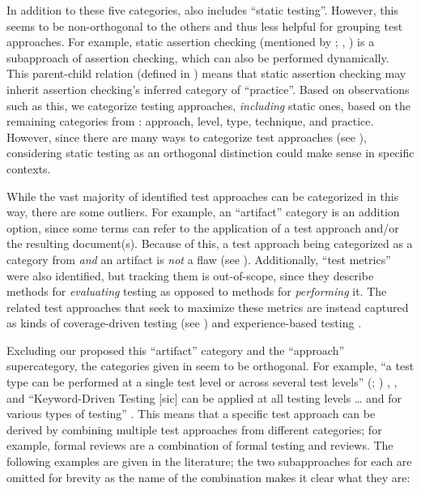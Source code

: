In addition to these five categories, \citet[Fig.~2]{IEEE2022} also includes
``static testing''. However, this seems to be non-orthogonal
to the others and thus less helpful for grouping test approaches.
For example, static assertion checking (mentioned by \ifnotpaper
    \citealp[p.~345]{LahiriEtAl2013}; \citealp[p.~343]{ChalinEtAl2006}\else
    \citealp[p.~343]{ChalinEtAl2006}, \citealp[p.~345]{LahiriEtAl2013}\fi) is a
subapproach of assertion checking, which can also be performed dynamically.
This parent-child relation (defined in ) means that static
assertion checking may inherit assertion checking's inferred category of
``practice''. Based on observations such as this, we categorize testing
approaches, \emph{including} static ones, based on the remaining categories
from \citet{IEEE2022}: approach, level, type, technique, and practice.
\ifnotpaper However, since there are many ways to categorize test approaches
    (see ), considering static
    testing as an orthogonal distinction could make sense in specific contexts.

    \afterpage{
        \begin{landscape}
            \ieeeCatsTable{}
        \end{landscape}
    }
\fi

While the vast majority of identified test approaches can be categorized
in this way, \ifnotpaper there are some outliers. For example, \fi
an ``artifact'' category is an addition option,
since some terms can refer to the application of
a test approach and/or the resulting document(s). Because of this, a test
approach being categorized as a category from 
\emph{and} an artifact is \emph{not} a flaw
(see ). \ifnotpaper
    Additionally, ``test metrics'' were also identified,
    but tracking them is out-of-scope, since they describe methods for
    \emph{evaluating} testing as opposed to methods for \emph{performing} it.
    The related test approaches that seek to maximize these metrics are instead
    captured as kinds of coverage-driven testing (see ) and
    experience-based testing \citep[p.~34]{IEEE2022}.

\fi
Excluding \ifnotpaper our proposed \else this \fi ``artifact'' category and the
``approach'' supercategory, the categories given in  seem to
be orthogonal. For example, ``a test type can be performed at a single test
level or across several test levels''
\ifnotpaper
    (\citealp[p.~15]{IEEE2022}; \citeyear[p.~7]{IEEE2021})%
\else
    \cite[p.~15]{IEEE2022}, \cite[p.~7]{IEEE2021}%
\fi, and ``Keyword-Driven Testing [sic] can be applied at all testing levels
\dots{} and for various types of testing'' \citeyearpar[p.~4]{IEEE2016}.
This means that a specific test approach can be derived by combining multiple
test approaches from different categories; for example, formal reviews are a
combination of formal testing and reviews. \ifnotpaper The following examples
    are given in the literature; the two subapproaches for each are omitted
    for brevity as the name of the combination makes it clear what they are:

